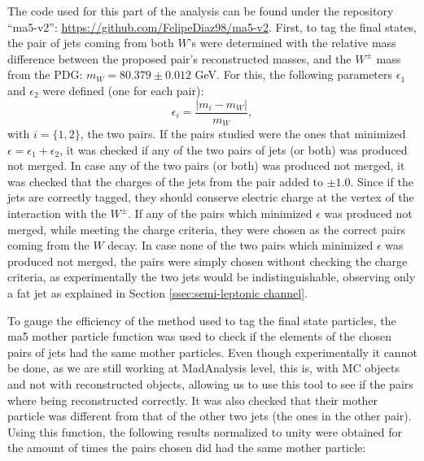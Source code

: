 The code used for this part of the analysis can be found under the repository ``ma5-v2'': \url{https://github.com/FelipeDiaz98/ma5-v2}. First, to tag the final states, the pair of jets coming from both $W$'s were determined with the relative mass difference between the proposed pair's reconstructed masses, and the $W^{\pm}$ mass from the PDG: $m_W = 80.379 \pm 0.012$ GeV. For this, the following parameters $\epsilon_1$ and $\epsilon_2$ were defined (one for each pair):
\begin{equation*}
    \epsilon_i = \dfrac{|m_i - m_W|}{m_W},
\end{equation*}
with $i=\{1,2\}$, the two pairs. If the pairs studied were the ones that minimized $\epsilon = \epsilon_1 + \epsilon_2$, it was checked if any of the two pairs of jets (or both) was produced not merged. In case any of the two pairs (or both) was produced not merged, it was checked that the charges of the jets from the pair added to $\pm 1.0$. Since if the jets are correctly tagged, they should conserve electric charge at the vertex of the interaction with the $W^{\pm}$. If any of the pairs which minimized $\epsilon$ was produced not merged, while meeting the charge criteria, they were chosen as the correct pairs coming from the $W$ decay. In case none of the two pairs which minimized $\epsilon$ was produced not merged, the pairs were simply chosen without checking the charge criteria, as experimentally the two jets would be indistinguishable, observing only a fat jet as explained in Section \ref{ssec:semi-leptonic channel}.

To gauge the efficiency of the method used to tag the final state particles, the ma5 mother particle function was used to check if the elements of the chosen pairs of jets had the same mother particles. Even though experimentally it cannot be done, as we are still working at MadAnalysis level, this is, with MC objects and not with reconstructed objects, allowing us to use this tool to see if the pairs where being reconstructed correctly. It was also checked that their mother particle was different from that of the other two jets (the ones in the other pair). Using this function, the following results normalized to unity were obtained for the amount of times the pairs chosen did had the same mother particle:

